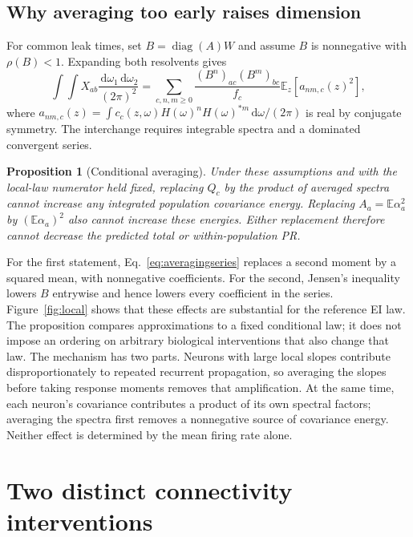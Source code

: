 \documentclass[11pt]{article}
\newcommand{\E}{\mathbb E}
\newcommand{\dd}{\,\mathrm d}
\newcommand{\diag}{\operatorname{diag}}
\newtheorem{proposition}{Proposition}
\begin{document}
\subsection{Why averaging too early raises dimension}

For common leak times, set $B=\diag(A)W$ and assume $B$ is nonnegative with
$\rho(B)<1$. Expanding both resolvents gives
\begin{equation}
 \int\!\!\int X_{ab}\frac{\dd\omega_1\dd\omega_2}{(2\pi)^2}
 =\sum_{c,n,m\geq0}\frac{(B^n)_{ac}(B^m)_{bc}}{f_c}
   \E_z[a_{nm,c}(z)^2],
 \label{eq:averagingseries}
\end{equation}
where
$a_{nm,c}(z)=\int c_c(z,\omega)H(\omega)^nH(\omega)^{*m}
\dd\omega/(2\pi)$ is real by conjugate symmetry. The interchange requires
integrable spectra and a dominated convergent series.

\begin{proposition}[Conditional averaging]
Under these assumptions and with the local-law numerator held fixed,
replacing $Q_c$ by the product of averaged spectra cannot increase any
integrated population covariance energy. Replacing $A_a=\E\alpha_a^2$ by
$(\E\alpha_a)^2$ also cannot increase these energies. Either replacement
therefore cannot decrease the predicted total or within-population PR.
\end{proposition}
For the first statement, Eq.~\eqref{eq:averagingseries} replaces a second
moment by a squared mean, with nonnegative coefficients. For the second,
Jensen's inequality lowers $B$ entrywise and hence lowers every coefficient
in the series. Figure~\ref{fig:local} shows that these effects are substantial
for the reference EI law. The proposition compares approximations to a fixed
conditional law; it does not impose an ordering on arbitrary biological
interventions that also change that law.
The mechanism has two parts. Neurons with large local slopes contribute
disproportionately to repeated recurrent propagation, so averaging the slopes
before taking response moments removes that amplification. At the same time,
each neuron's covariance contributes a product of its own spectral factors;
averaging the spectra first removes a nonnegative source of covariance
energy. Neither effect is determined by the mean firing rate alone.

\section{Two distinct connectivity interventions}
\end{document}
